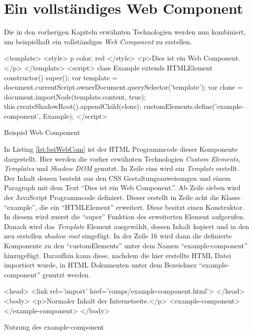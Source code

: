 \documentclass[12pt, paper=a4, bibtotoc, toc=listof, headsepline=true, numbers=endperiod]{scrreprt}
\begin{document}
		\section{Ein vollständiges Web Component}
		Die in den vorherigen Kapiteln erwähnten Technologien werden nun kombiniert, um beispielhaft ein vollständiges \emph{Web Component} zu erstellen. 		\begin{listing}
			\begin{HTMLcode*}{}
<template>
   <style>
      p {color: red}
   </style>
   <p>Dies ist ein Web Component.</p>
</template>
<script>
class Example extends HTMLElement {
   constructor() {
      super();
      var template = document.currentScript.ownerDocument.querySelector('template');
      var clone = document.importNode(template.content, true);
      this.createShadowRoot().appendChild(clone);
   }
}
customElements.define('example-component', Example);
</script>
			\end{HTMLcode*}
			\caption{Beispiel Web Component}
			\label{lst:beiWebCom}
		\end{listing}\noindent
		In Listing \ref{lst:beiWebCom} ist der \ac{HTML} Programmcode dieser Komponente dargestellt. Hier werden die vorher erwähnten Technologien \emph{Custom Elements}, \emph{Templates} und \emph{Shadow DOM} genutzt. In Zeile eins wird ein \emph{Template} erstellt. Der Inhalt dessen besteht aus den \ac{CSS} Gestaltungsanweisungen und einem Paragraph mit dem Text \enquote{Dies ist ein Web Component.}. Ab Zeile sieben wird der JavaScript Programmcode definiert. Dieser erstellt in Zeile acht die Klasse \enquote{example}, die ein \enquote{HTMLElement} erweitert. Diese besitzt einen Konstruktor. In diesem wird zuerst die \enquote{super} Funktion des erweiterten Element aufgerufen. Danach wird das \emph{Template} Element ausgewählt, dessen Inhalt kopiert und in den neu erstellen \emph{shadow root} eingefügt. In der Zeile 16 wird dann die definierte Komponente zu den \enquote{customElements} unter dem Namen \enquote{example-component} hinzugefügt. Daraufhin kann diese, nachdem die hier erstellte \ac{HTML} Datei importiert wurde, in \ac{HTML} Dokumenten unter dem Bezeichner \enquote{example-component} genutzt werden.
\begin{listing}[H]
	\begin{HTMLcode*}{}
<head>
   <link rel='import' href='comps/example-component.html'>
</head>
<body>
   <p>Normaler Inhalt der Internetseite.</p>
   <example-component></example-component>
</body>
	\end{HTMLcode*}
	\caption{Nutzung des example-component}
	\label{lst:nutExaCom}
\end{listing}\noindent
\end{document}
